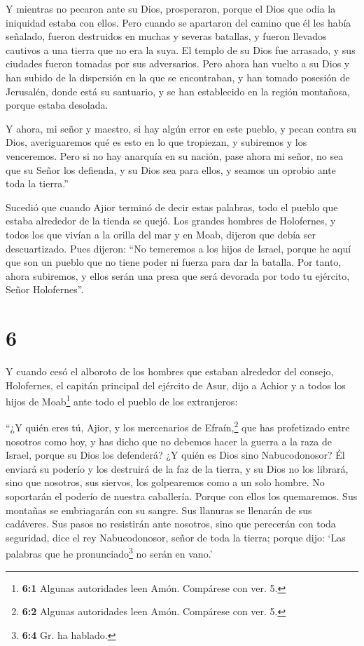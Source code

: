  Y mientras no pecaron ante su Dios, prosperaron, porque
el Dios que odia la iniquidad estaba con ellos.  Pero
cuando se apartaron del camino que él les había señalado, fueron
destruidos en muchas y severas batallas, y fueron llevados cautivos a
una tierra que no era la suya. El templo de su Dios fue arrasado, y sus
ciudades fueron tomadas por sus adversarios.  Pero ahora
han vuelto a su Dios y han subido de la dispersión en la que se
encontraban, y han tomado posesión de Jerusalén, donde está su
santuario, y se han establecido en la región montañosa, porque estaba
desolada.

 Y ahora, mi señor y maestro, si hay algún error en este
pueblo, y pecan contra su Dios, averiguaremos qué es esto en lo que
tropiezan, y subiremos y los venceremos.  Pero si no hay
anarquía en su nación, pase ahora mi señor, no sea que su Señor los
defienda, y su Dios sea para ellos, y seamos un oprobio ante toda la
tierra.''

 Sucedió que cuando Ajior terminó de decir estas
palabras, todo el pueblo que estaba alrededor de la tienda se quejó. Los
grandes hombres de Holofernes, y todos los que vivían a la orilla del
mar y en Moab, dijeron que debía ser descuartizado.  Pues
dijeron: ``No temeremos a los hijos de Israel, porque he aquí que son un
pueblo que no tiene poder ni fuerza para dar la batalla. 
Por tanto, ahora subiremos, y ellos serán una presa que será devorada
por todo tu ejército, Señor Holofernes''.

\hypertarget{section-5}{%
\section{6}\label{section-5}}

 Y cuando cesó el alboroto de los hombres que estaban
alrededor del consejo, Holofernes, el capitán principal del ejército de
Asur, dijo a Achior y a todos los hijos de Moab\footnote{\textbf{6:1}
  Algunas autoridades leen Amón. Compárese con ver. 5.} ante todo el
pueblo de los extranjeros:

 ``¿Y quién eres tú, Ajior, y los mercenarios de
Efraín,\footnote{\textbf{6:2} Algunas autoridades leen Amón. Compárese
  con ver. 5.} que has profetizado entre nosotros como hoy, y has dicho
que no debemos hacer la guerra a la raza de Israel, porque su Dios los
defenderá? ¿Y quién es Dios sino Nabucodonosor?  Él
enviará su poderío y los destruirá de la faz de la tierra, y su Dios no
los librará, sino que nosotros, sus siervos, los golpearemos como a un
solo hombre. No soportarán el poderío de nuestra caballería.
 Porque con ellos los quemaremos. Sus montañas se
embriagarán con su sangre. Sus llanuras se llenarán de sus cadáveres.
Sus pasos no resistirán ante nosotros, sino que perecerán con toda
seguridad, dice el rey Nabucodonosor, señor de toda la tierra; porque
dijo: `Las palabras que he pronunciado\footnote{\textbf{6:4} Gr. ha
  hablado.} no serán en vano.'


